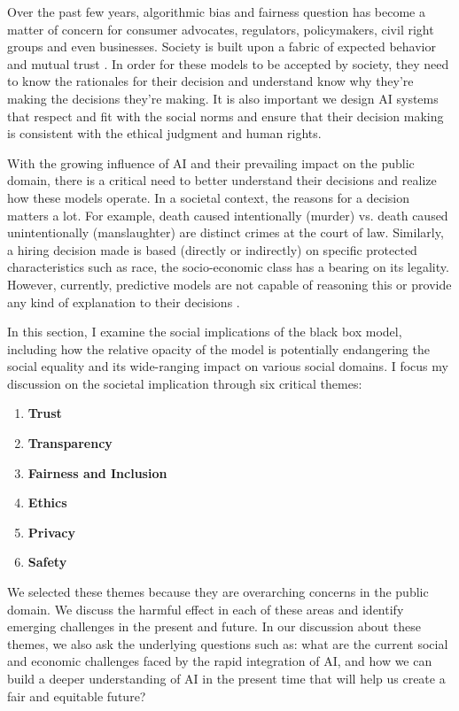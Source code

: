 Over the past few years, algorithmic bias and fairness question has become a matter of concern for consumer advocates, regulators, policymakers, civil right groups and even businesses. Society is built upon a fabric of expected behavior and mutual trust \cite{Lipton2018}. In order for these models to be accepted by society, they need to know the rationales for their decision and understand know why they’re making the decisions they’re making. It is also important we design AI systems that respect and fit with the social norms and ensure that their decision making is consistent with the ethical judgment and human rights.

With the growing influence of AI and their prevailing impact on the public domain, there is a critical need to better understand their decisions and realize how these models operate.  In a societal context, the reasons for a decision matters a lot. For example, death caused intentionally (murder) vs. death caused unintentionally (manslaughter) are distinct crimes at the court of law. Similarly, a hiring decision made is based (directly or indirectly) on specific protected characteristics such as race, the socio-economic class has a bearing on its legality. However, currently, predictive models are not capable of reasoning this or provide any kind of explanation to their decisions \cite{molnar}.

In this section, I examine the social implications of the black box model, including how the relative opacity of the model is potentially endangering the social equality and its wide-ranging impact on various social domains. I focus my discussion on the societal implication through six critical themes:

\begin{enumerate}
\item \textbf{Trust}
\item  \textbf{Transparency}
\item \textbf{Fairness and Inclusion}
\item \textbf{Ethics}
\item \textbf{Privacy}
\item \textbf{Safety}
\end{enumerate}

We selected these themes because they are overarching concerns in the public domain. We discuss the harmful effect in each of these areas and identify emerging challenges in the present and future. In our discussion about these themes, we also ask the underlying questions such as: what are the current social and economic challenges faced by the rapid integration of AI, and how we can build a deeper understanding of AI \cite{Solon2017} in the present time that will help us create a fair and equitable future?


